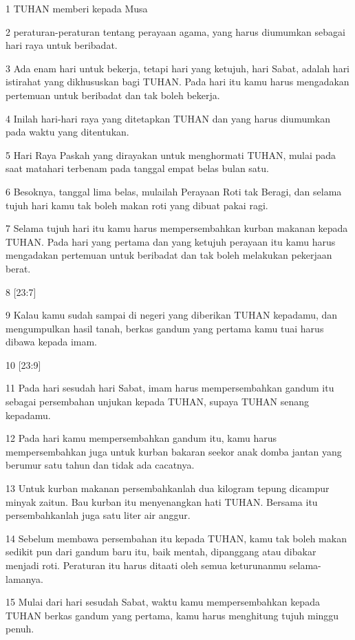\par 1 TUHAN memberi kepada Musa
\par 2 peraturan-peraturan tentang perayaan agama, yang harus diumumkan sebagai hari raya untuk beribadat.
\par 3 Ada enam hari untuk bekerja, tetapi hari yang ketujuh, hari Sabat, adalah hari istirahat yang dikhususkan bagi TUHAN. Pada hari itu kamu harus mengadakan pertemuan untuk beribadat dan tak boleh bekerja.
\par 4 Inilah hari-hari raya yang ditetapkan TUHAN dan yang harus diumumkan pada waktu yang ditentukan.
\par 5 Hari Raya Paskah yang dirayakan untuk menghormati TUHAN, mulai pada saat matahari terbenam pada tanggal empat belas bulan satu.
\par 6 Besoknya, tanggal lima belas, mulailah Perayaan Roti tak Beragi, dan selama tujuh hari kamu tak boleh makan roti yang dibuat pakai ragi.
\par 7 Selama tujuh hari itu kamu harus mempersembahkan kurban makanan kepada TUHAN. Pada hari yang pertama dan yang ketujuh perayaan itu kamu harus mengadakan pertemuan untuk beribadat dan tak boleh melakukan pekerjaan berat.
\par 8 [23:7]
\par 9 Kalau kamu sudah sampai di negeri yang diberikan TUHAN kepadamu, dan mengumpulkan hasil tanah, berkas gandum yang pertama kamu tuai harus dibawa kepada imam.
\par 10 [23:9]
\par 11 Pada hari sesudah hari Sabat, imam harus mempersembahkan gandum itu sebagai persembahan unjukan kepada TUHAN, supaya TUHAN senang kepadamu.
\par 12 Pada hari kamu mempersembahkan gandum itu, kamu harus mempersembahkan juga untuk kurban bakaran seekor anak domba jantan yang berumur satu tahun dan tidak ada cacatnya.
\par 13 Untuk kurban makanan persembahkanlah dua kilogram tepung dicampur minyak zaitun. Bau kurban itu menyenangkan hati TUHAN. Bersama itu persembahkanlah juga satu liter air anggur.
\par 14 Sebelum membawa persembahan itu kepada TUHAN, kamu tak boleh makan sedikit pun dari gandum baru itu, baik mentah, dipanggang atau dibakar menjadi roti. Peraturan itu harus ditaati oleh semua keturunanmu selama-lamanya.
\par 15 Mulai dari hari sesudah Sabat, waktu kamu mempersembahkan kepada TUHAN berkas gandum yang pertama, kamu harus menghitung tujuh minggu penuh.
